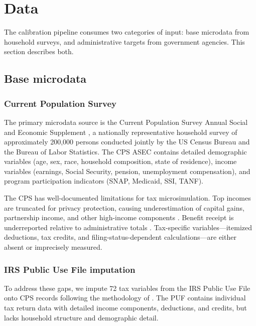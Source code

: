 \section{Data}
\label{sec:data}

The calibration pipeline consumes two categories of input: base microdata from household surveys, and administrative targets from government agencies. This section describes both.

\subsection{Base microdata}

\subsubsection{Current Population Survey}

The primary microdata source is the Current Population Survey Annual Social and Economic Supplement \citep[CPS ASEC;][]{census2024}, a nationally representative household survey of approximately 200,000 persons conducted jointly by the US Census Bureau and the Bureau of Labor Statistics. The CPS ASEC contains detailed demographic variables (age, sex, race, household composition, state of residence), income variables (earnings, Social Security, pension, unemployment compensation), and program participation indicators (SNAP, Medicaid, SSI, TANF).

The CPS has well-documented limitations for tax microsimulation. Top incomes are truncated for privacy protection, causing underestimation of capital gains, partnership income, and other high-income components \citep{burkhauser2012}. Benefit receipt is underreported relative to administrative totals \citep{rothbaum2021, meyer2021}. Tax-specific variables---itemized deductions, tax credits, and filing-status-dependent calculations---are either absent or imprecisely measured.

\subsubsection{IRS Public Use File imputation}

To address these gaps, we impute 72 tax variables from the IRS Public Use File \citep[PUF;][]{bryant2023a} onto CPS records following the methodology of \citet{woodruff2024}. The PUF contains individual tax return data with detailed income components, deductions, and credits, but lacks household structure and demographic detail.

